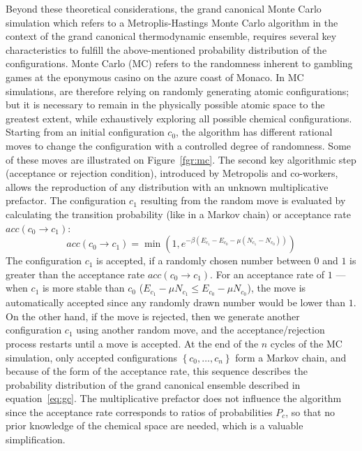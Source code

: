 \documentclass[main.tex]{subfiles}
\begin{document}
Beyond these theoretical considerations, the grand canonical Monte Carlo simulation which refers to a Metroplis-Hastings Monte Carlo algorithm in the context of the grand canonical thermodynamic ensemble, requires several key characteristics to fulfill the above-mentioned probability distribution of the configurations. Monte Carlo (MC) refers to the randomness inherent to gambling games at the eponymous casino on the azure coast of Monaco. In MC simulations, are therefore relying on randomly generating atomic configurations; but it is necessary to remain in the physically possible atomic space to the greatest extent, while exhaustively exploring all possible chemical configurations. 
Starting from an initial configuration $c_0$, the algorithm has different rational moves to change the configuration with a controlled degree of randomness. Some of these moves are illustrated on Figure~\ref{fgr:mc}. The second key algorithmic step (acceptance or rejection condition), introduced by Metropolis and co-workers, allows the reproduction of any distribution with an unknown multiplicative prefactor.\autocite{Metropolis1949} The configuration $c_1$ resulting from the random move is evaluated by calculating the transition probability (like in a Markov chain) or acceptance rate $acc(c_0 \rightarrow c_1)$: 
\begin{equation}
  acc(c_0 \rightarrow c_1) = \min\left(1, e^{-\beta\left(E_{c_1}-E_{c_0}-\mu \left(N_{c_1}-N_{c_0}\right)\right) }\right)
\end{equation}
The configuration $c_1$ is accepted, if a randomly chosen number between $0$ and $1$ is greater than the acceptance rate $acc(c_0 \rightarrow c_1)$. For an acceptance rate of $1$ --- when $c_1$ is more stable than $c_0$ ($E_{c_1}-\mu N_{c_1}\leq E_{c_0}-\mu N_{c_0}$), the move is automatically accepted since any randomly drawn number would be lower than $1$. On the other hand, if the move is rejected, then we generate another configuration $c_1$ using another random move, and the acceptance/rejection process restarts until a move is accepted. At the end of the $n$ cycles of the MC simulation, only accepted configurations $\left\{c_0,\ldots,c_n\right\}$ form a Markov chain, and because of the form of the acceptance rate, this sequence describes the probability distribution of the grand canonical ensemble described in equation~\ref{eq:gc}. The multiplicative prefactor does not influence the algorithm since the acceptance rate corresponds to ratios of probabilities $P_c$, so that no prior knowledge of the chemical space are needed, which is a valuable simplification.
\end{document}
